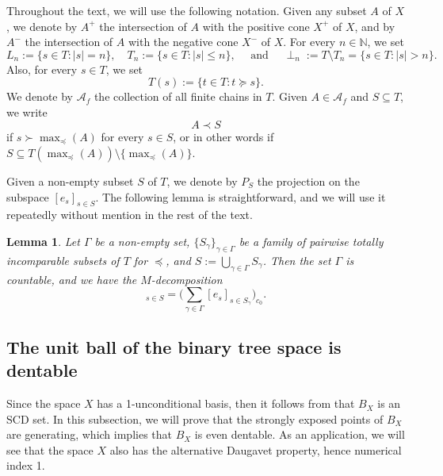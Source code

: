 \documentclass[11pt,a4paper,reqno]{amsart}
\numberwithin{equation}{section}
\newcommand{\abs}[1]{\left\lvert#1\right\rvert}
\newcommand{\N}{\mathbb{N}}
\newcommand{\A}{\mathcal{A}}
\newcommand{\1}{\mathbbm{1}}
\renewcommand{\leq}{\leqslant}
\theoremstyle{plain}
\newtheorem{lemma}[theorem]{Lemma}
\theoremstyle{definition}
\begin{document}
Throughout the text, we will use the following notation. Given any subset $A$ of $X$, we denote by $A^+$ the intersection of $A$ with the positive cone $X^+$ of $X$, and by $A^-$ the intersection of $A$ with the negative cone $X^-$ of $X$. For every $n\in\N$, we set \begin{equation*}
    L_n:=\{s\in T\colon \abs{s}=n\}, \quad T_n:=\{s\in T\colon \abs{s}\leq n\}, \quad \text{ and } \quad \perp_n:=T\setminus T_n=\{s\in T\colon \abs{s}>n\}.
\end{equation*} Also, for every $s\in T$, we set \begin{equation*}
    T(s):=\{t\in T\colon t\succeq s\}.
\end{equation*} We denote by $\A_f$ the collection of all finite chains in $T$. Given $A\in\A_f$ and $S\subseteq T$, we write \begin{equation*}
    A\prec S
\end{equation*} if $s\succ \max_{\preceq}(A)$ for every $s\in S$, or in other words if $S\subseteq T(\max_{\preceq}(A))\setminus \{\max_{\preceq}(A)\}$. 

Given a non-empty subset $S$ of $T$, we denote by $P_S$ the projection on the subspace $[e_s]_{s\in S}$. The following lemma is straightforward, and we will use it repeatedly without mention in the rest of the text. 

\begin{lemma}\label{lem:totally_incomparable_decomposition}
    Let $\Gamma$ be a non-empty set, $\{S_\gamma\}_{\gamma\in\Gamma}$ be a family of pairwise totally incomparable subsets of $T$ for $\preceq$, and $S:=\bigcup_{\gamma\in\Gamma}S_\gamma$. Then the set $\Gamma$ is countable, and we have the $M$-decomposition \begin{equation*}
        [e_s]_{s\in S}=\bigg(\sum_{\gamma\in\Gamma}[e_s]_{s\in S_\gamma}\bigg)_{c_0}.
    \end{equation*}
\end{lemma}

\subsection{The unit ball of the binary tree space is dentable}\label{subsec:binary_tree_dentability} Since the space $X$ has a 1-unconditional basis, then it follows from \cite[Theorem~3.1]{KMMW2013} that $B_X$ is an SCD set. In this subsection, we will prove that the strongly exposed points of $B_X$ are generating, which implies that $B_X$ is even dentable. As an application, we will see that the space $X$ also has the alternative Daugavet property, hence numerical index 1. 
\end{document}
